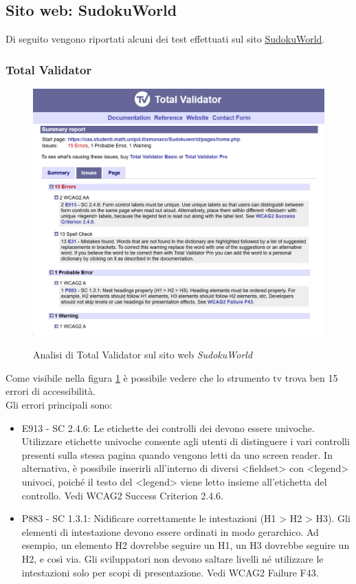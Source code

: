 \subsection{Sito web: SudokuWorld}
\noindent Di seguito vengono riportati alcuni dei test effettuati sul sito \href{https://caa.studenti.math.unipd.it/amonaco/Sudokuworld/pages/home.php}{SudokuWorld}.

\subsubsection{Total Validator}
\begin{figure}[H]
    \centering
    \includegraphics[width=0.7\linewidth, alt={Screenshot dell'analisi di Total Validator sul sito web SudokuWorld}]{img/TV_sudoku.png}
    \caption{Analisi di Total Validator sul sito web \textit{SudokuWorld}}\label{fig:TV_sudoku}
\end{figure}

\noindent Come visibile nella figura \ref{fig:TV_sudoku} è possibile vedere che lo strumento \acrshort{tv} trova ben 15 errori di accessibilità.\\
Gli errori principali sono: 
\begin{itemize}
    \item E913 - SC 2.4.6: Le etichette dei controlli dei  devono essere univoche. Utilizzare etichette univoche consente agli utenti di distinguere i vari controlli presenti sulla stessa pagina quando vengono letti da uno screen reader. In alternativa, è possibile inserirli all’interno di diversi <fieldset> con <legend> univoci, poiché il testo del <legend> viene letto insieme all’etichetta del controllo. Vedi WCAG2 Success Criterion 2.4.6.
    \item P883 - SC 1.3.1: Nidificare correttamente le intestazioni (H1 > H2 > H3). Gli elementi di intestazione devono essere ordinati in modo gerarchico. Ad esempio, un elemento H2 dovrebbe seguire un H1, un H3 dovrebbe seguire un H2, e così via. Gli sviluppatori non devono saltare livelli né utilizzare le intestazioni solo per scopi di presentazione. Vedi WCAG2 Failure F43.
\end{itemize}

